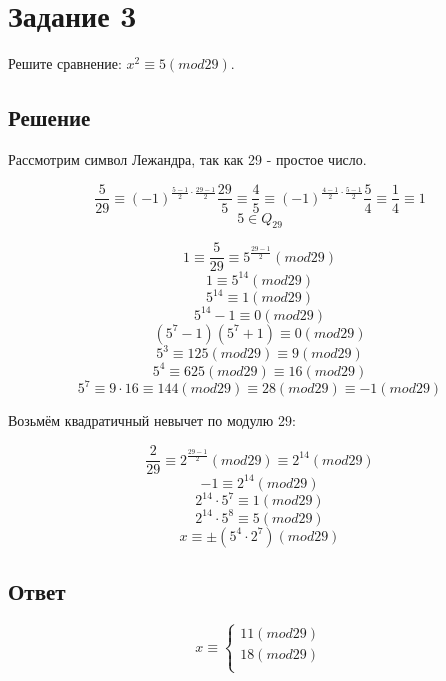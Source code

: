 \documentclass[14pt, a4paper]{article}
\begin{document}
    \vspace{2cm}
    \section*{Задание 3}
    Решите сравнение: $x^{2} \equiv 5(mod29)$.

    \subsection*{Решение}

    Рассмотрим символ Лежандра, так как 29 - простое число.

    \[ \frac{5}{29} \equiv (-1)^{\frac{5-1}{2} \cdot \frac{29-1}{2}} \frac{29}{5} \equiv \frac{4}{5} \equiv (-1)^{\frac{4-1}{2} \cdot \frac{5-1}{2}}\frac{5}{4} \equiv \frac{1}{4} \equiv 1\]
    \[ 5 \in Q_{29} \]

    \[ 1 \equiv \frac{5}{29} \equiv 5^{\frac{29-1}{2}}(mod29) \]
    \[ 1 \equiv 5^{14}(mod29) \]
    \[ 5^{14} \equiv 1(mod29) \]
    \[ 5^{14} - 1 \equiv 0(mod29) \]
    \[ (5^{7} -1)(5^{7} + 1) \equiv 0(mod29)\]
    \[ 5^{3} \equiv 125(mod29) \equiv 9(mod29) \]
    \[ 5^{4} \equiv 625(mod29) \equiv 16(mod29) \]
    \[ 5^{7} \equiv 9 \cdot 16 \equiv 144(mod29) \equiv 28(mod29) \equiv -1(mod29) \]

    Возьмём квадратичный невычет по модулю 29:

    \[ \frac{2}{29} \equiv 2^{\frac{29-1}{2}}(mod29) \equiv 2^{14}(mod29) \]
    \[ -1 \equiv 2^{14}(mod29) \]
    \[ 2^{14} \cdot 5^{7} \equiv 1(mod29) \]
    \[ 2^{14} \cdot 5^{8} \equiv 5(mod29) \]
    \[ x \equiv \pm(5^{4} \cdot 2^{7})(mod29) \]

    \subsection*{Ответ}

    \begin{equation*}
        x \equiv 
        \begin{cases}
            11(mod29) \\
            18(mod29) \\
        \end{cases}
    \end{equation*}
\end{document}
